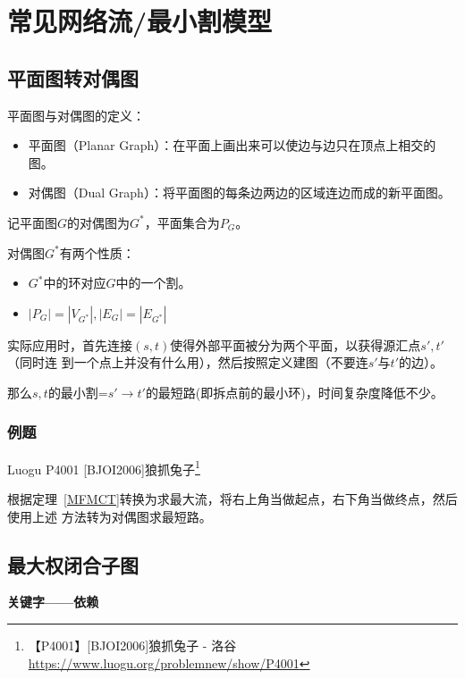 \section{常见网络流/最小割模型}
\subsection{平面图转对偶图}

平面图与对偶图的定义：
\begin{itemize}
	\item 平面图（Planar Graph）：在平面上画出来可以使边与边只在顶点上相交的图。
	\item 对偶图（Dual Graph）：将平面图的每条边两边的区域连边而成的新平面图。
\end{itemize}

记平面图$G$的对偶图为$G^*$，平面集合为$P_G$。

对偶图$G^*$有两个性质：
\begin{itemize}
	\item
	      \begin{property}
		      $G^*$中的环对应$G$中的一个割。
	      \end{property}
	\item
	      \begin{property}
		      $|P_G|=|V_{G^*}|,|E_G|=|E_{G^*}|$
	      \end{property}
\end{itemize}

实际应用时，首先连接$(s,t)$使得外部平面被分为两个平面，以获得源汇点$s',t'$（同时连
到一个点上并没有什么用），然后按照定义建图（不要连$s'$与$t'$的边）。

那么$s,t$的最小割=$s'\rightarrow t'$的最短路(即拆点前的最小环)，时间复杂度降低不少。

\subsubsection{例题}

Luogu P4001 [BJOI2006]狼抓兔子\footnote{【P4001】[BJOI2006]狼抓兔子 - 洛谷
\url{https://www.luogu.org/problemnew/show/P4001}}

根据定理~\ref{MFMCT}转换为求最大流，将右上角当做起点，右下角当做终点，然后使用上述
方法转为对偶图求最短路。



\subsection{最大权闭合子图}
{\bfseries 关键字——依赖}

